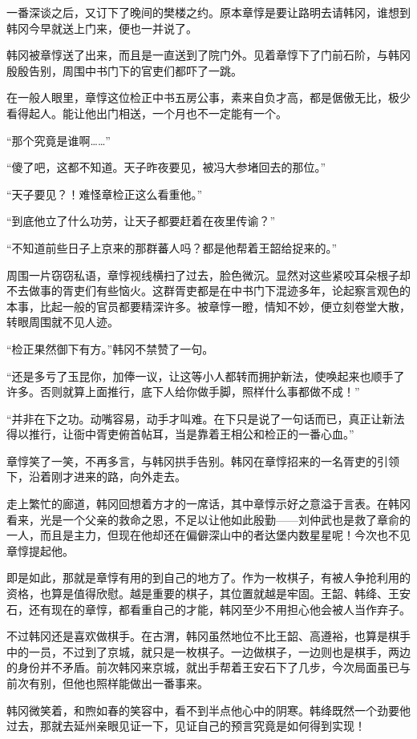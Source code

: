 一番深谈之后，又订下了晚间的樊楼之约。原本章惇是要让路明去请韩冈，谁想到韩冈今早就送上门来，便也一并说了。

韩冈被章惇送了出来，而且是一直送到了院门外。见着章惇下了门前石阶，与韩冈殷殷告别，周围中书门下的官吏们都吓了一跳。

在一般人眼里，章惇这位检正中书五房公事，素来自负才高，都是倨傲无比，极少看得起人。能让他出门相送，一个月也不一定能有一个。

“那个究竟是谁啊……”

“傻了吧，这都不知道。天子昨夜要见，被冯大参堵回去的那位。”

“天子要见？！难怪章检正这么看重他。”

“到底他立了什么功劳，让天子都要赶着在夜里传谕？”

“不知道前些日子上京来的那群蕃人吗？都是他帮着王韶给捉来的。”

周围一片窃窃私语，章惇视线横扫了过去，脸色微沉。显然对这些紧咬耳朵根子却不去做事的胥吏们有些恼火。这群胥吏都是在中书门下混迹多年，论起察言观色的本事，比起一般的官员都要精深许多。被章惇一瞪，情知不妙，便立刻卷堂大散，转眼周围就不见人迹。

“检正果然御下有方。”韩冈不禁赞了一句。

“还是多亏了玉昆你，加俸一议，让这等小人都转而拥护新法，使唤起来也顺手了许多。否则就算上面推行，底下人给你做手脚，照样什么事都做不成！”

“并非在下之功。动嘴容易，动手才叫难。在下只是说了一句话而已，真正让新法得以推行，让衙中胥吏俯首帖耳，当是靠着王相公和检正的一番心血。”

章惇笑了一笑，不再多言，与韩冈拱手告别。韩冈在章惇招来的一名胥吏的引领下，沿着刚才进来的路，向外走去。

走上繁忙的廊道，韩冈回想着方才的一席话，其中章惇示好之意溢于言表。在韩冈看来，光是一个父亲的救命之恩，不足以让他如此殷勤——刘仲武也是救了章俞的一人，而且是主力，但现在他却还在偏僻深山中的者达堡内数星星呢！今次也不见章惇提起他。

即是如此，那就是章惇有用的到自己的地方了。作为一枚棋子，有被人争抢利用的资格，也算是值得欣慰。越是重要的棋子，其位置就越是牢固。王韶、韩绛、王安石，还有现在的章惇，都看重自己的才能，韩冈至少不用担心他会被人当作弃子。

不过韩冈还是喜欢做棋手。在古渭，韩冈虽然地位不比王韶、高遵裕，也算是棋手中的一员，不过到了京城，就只是一枚棋子。一边做棋子，一边则也是棋手，两边的身份并不矛盾。前次韩冈来京城，就出手帮着王安石下了几步，今次局面虽已与前次有别，但他也照样能做出一番事来。

韩冈微笑着，和煦如春的笑容中，看不到半点他心中的阴寒。韩绛既然一个劲要他过去，那就去延州亲眼见证一下，见证自己的预言究竟是如何得到实现！

